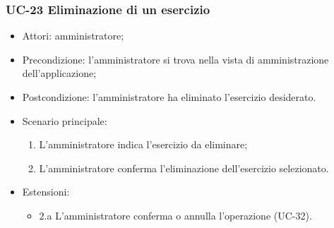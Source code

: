 	\subsubsection{UC-23 Eliminazione di un esercizio}
			\begin{itemize}
			\item Attori: amministratore;
			\item Precondizione: l'amministratore si trova nella vista di amministrazione dell'applicazione;
			\item Postcondizione: l'amministratore ha eliminato l'esercizio desiderato.
			\item Scenario principale:
				\begin{enumerate}
					\item L'amministratore indica l'esercizio da eliminare;
					\item L'amministratore conferma l'eliminazione dell'esercizio selezionato.
				\end{enumerate}
			\item Estensioni:
			\begin{itemize}
			\item 2.a L'amministratore conferma o annulla l'operazione (UC-32).
			\end{itemize}
		\end{itemize}